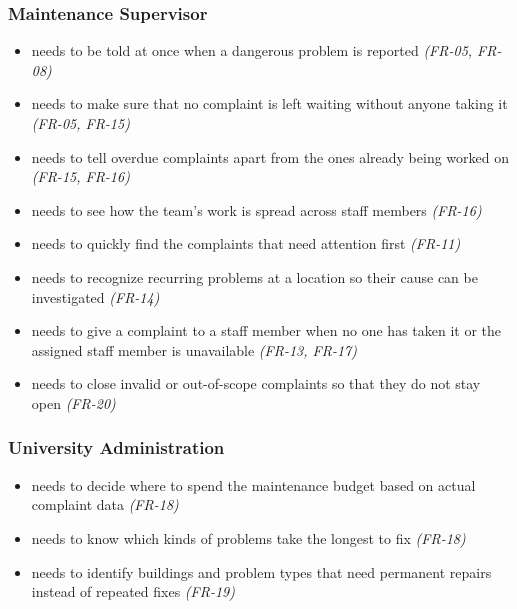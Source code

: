 \subsubsection*{Maintenance Supervisor}

\begin{itemize}
  \item needs to be told at once when a dangerous problem is reported \textit{(FR-05, FR-08)}
  \item needs to make sure that no complaint is left waiting without anyone taking it \textit{(FR-05, FR-15)}
  \item needs to tell overdue complaints apart from the ones already being worked on \textit{(FR-15, FR-16)}
  \item needs to see how the team's work is spread across staff members \textit{(FR-16)}
  \item needs to quickly find the complaints that need attention first \textit{(FR-11)}
  \item needs to recognize recurring problems at a location so their cause can be investigated \textit{(FR-14)}
  \item needs to give a complaint to a staff member when no one has taken it or the assigned staff member is unavailable \textit{(FR-13, FR-17)}
  \item needs to close invalid or out-of-scope complaints so that they do not stay open \textit{(FR-20)}
\end{itemize}

\subsubsection*{University Administration}

\begin{itemize}
  \item needs to decide where to spend the maintenance budget based on actual complaint data \textit{(FR-18)}
  \item needs to know which kinds of problems take the longest to fix \textit{(FR-18)}
  \item needs to identify buildings and problem types that need permanent repairs instead of repeated fixes \textit{(FR-19)}
\end{itemize}

